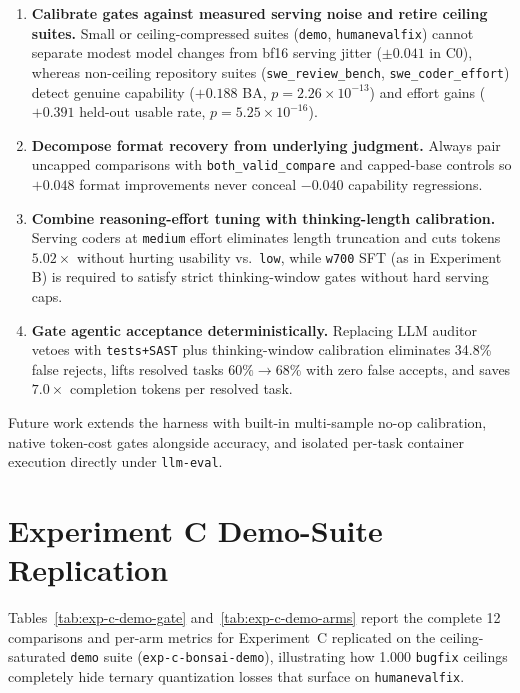 \documentclass[conference]{IEEEtran}
\begin{document}
\begin{enumerate}
\item \textbf{Calibrate gates against measured serving noise and retire ceiling suites.} Small or ceiling-compressed suites (\texttt{demo}, \texttt{humanevalfix}) cannot separate modest model changes from bf16 serving jitter ($\pm 0.041$ in C0), whereas non-ceiling repository suites (\texttt{swe\_\allowbreak{}review\_\allowbreak{}bench}, \texttt{swe\_\allowbreak{}coder\_\allowbreak{}effort}) detect genuine capability ($+0.188$ BA, $p=2.26\times 10^{-13}$) and effort gains ($+0.391$ held-out usable rate, $p=5.25\times 10^{-16}$).
\item \textbf{Decompose format recovery from underlying judgment.} Always pair uncapped comparisons with \texttt{both\_\allowbreak{}valid\_\allowbreak{}compare} and capped-base controls so $+0.048$ format improvements never conceal $-0.040$ capability regressions.
\item \textbf{Combine reasoning-effort tuning with thinking-length calibration.} Serving coders at \texttt{medium} effort eliminates length truncation and cuts tokens $5.02\times$ without hurting usability vs.\ \texttt{low}, while \texttt{w700} SFT (as in Experiment B) is required to satisfy strict thinking-window gates without hard serving caps.
\item \textbf{Gate agentic acceptance deterministically.} Replacing LLM auditor vetoes with \texttt{tests+SAST} plus thinking-window calibration eliminates 34.8\% false rejects, lifts resolved tasks $60\% \to 68\%$ with zero false accepts, and saves $7.0\times$ completion tokens per resolved task.
\end{enumerate}

Future work extends the harness with built-in multi-sample no-op calibration, native token-cost gates alongside accuracy, and isolated per-task container execution directly under \texttt{llm-eval}.

\appendices
\section{Experiment C Demo-Suite Replication}
\label{app:expc-demo}

Tables~\ref{tab:exp-c-demo-gate} and~\ref{tab:exp-c-demo-arms} report the complete 12 comparisons and per-arm metrics for Experiment~C replicated on the ceiling-saturated \texttt{demo} suite (\texttt{exp-{}c-{}bonsai-{}demo}), illustrating how 1.000 \texttt{bugfix} ceilings completely hide ternary quantization losses that surface on \texttt{humanevalfix}.







\end{document}
